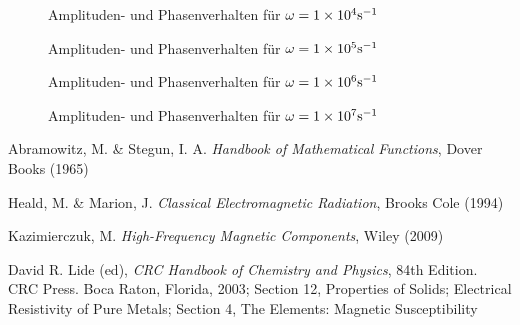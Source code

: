 \documentclass[10pt,a4paper]{article}
\begin{document}
\begin{figure}[htbp]
\centering
\scalebox{1.0}{}
\caption{Amplituden- und Phasenverhalten für $\omega=\num{1E4} \si{\per\second}$}
\end{figure}
\begin{figure}[htbp]
\centering
\scalebox{1.0}{}
\caption{Amplituden- und Phasenverhalten für $\omega=\num{1E5} \si{\per\second}$}
\end{figure}
\begin{figure}[htbp]
\centering
\scalebox{1.0}{}
\caption{Amplituden- und Phasenverhalten für $\omega=\num{1E6} \si{\per\second}$}
\end{figure}
\begin{figure}[htbp]
\centering
\scalebox{1.0}{}
\caption{Amplituden- und Phasenverhalten für $\omega=\num{1E7} \si{\per\second}$}
\end{figure}
\begin{thebibliography}{9}

Abramowitz, M. \& Stegun, I. A.
\emph{Handbook of Mathematical Functions},
Dover Books (1965)

Heald, M. \& Marion, J.
\emph{Classical Electromagnetic Radiation},
Brooks Cole (1994)

Kazimierczuk, M.
\emph{High-Frequency Magnetic Components},
Wiley (2009)

David R. Lide (ed),
\emph{CRC Handbook of Chemistry and Physics},
84th Edition. CRC Press. Boca Raton, Florida, 2003;
Section 12, Properties of Solids; Electrical Resistivity of Pure Metals;
Section 4, The Elements: Magnetic Susceptibility

\end{thebibliography}
\end{document}
